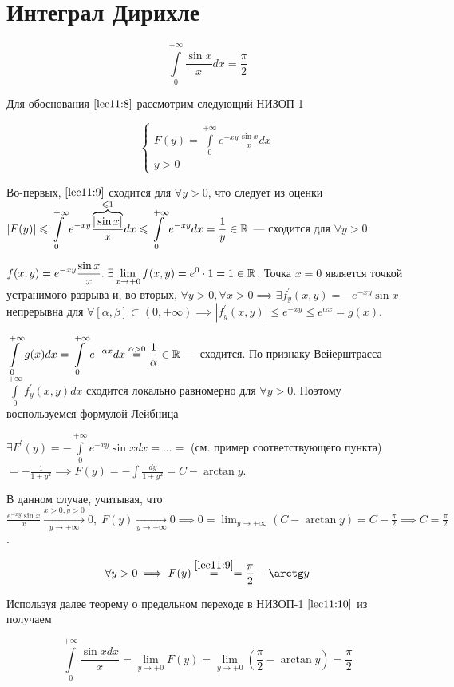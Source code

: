 \documentclass[../../main.tex]{subfiles}
\begin{document}
	\section{Интеграл Дирихле}
	
	\begin{equation}\label{lec11:8}
		\int\limits_0^{+\infty} \frac{\sin x}{x} dx = \frac{\pi}{2}
	\end{equation}	
	
	Для обоснования $\eqref{lec11:8}$ рассмотрим следующий НИЗОП-1
	
	\begin{equation}\label{lec11:9}
		\begin{cases}
			\displaystyle F(y) = \int\limits_0^{+\infty} e^{-xy} \frac{\sin x}{x} dx \\
			y > 0
		\end{cases}
	\end{equation}

	Во-первых, $\eqref{lec11:9}$ сходится для $\forall y > 0$, что следует из оценки $\displaystyle \left|F(y)\right| \leqslant \int\limits_0^{+\infty} e^{-xy} \frac{\overbrace{|\sin x|}^{\leqslant 1}}{x} dx \leqslant \int\limits_0^{+\infty} e^{-xy} dx = \frac{1}{y} \in \mathbb{R}$ --- сходится для $\forall y > 0$. 
	
	$\displaystyle f(x, y) = e^{-xy} \frac{\sin x}{x}. \; \exists \lim_{x \rightarrow +0} f(x, y) = e^0 \cdot 1 = 1 \in \mathbb{R}$. Точка $x = 0$ является точкой устранимого разрыва и, во-вторых, $\displaystyle\forall y > 0, \forall x > 0 \implies \exists f^{'}_y (x, y) = -e^{-xy} \sin x$ непрерывна для $\displaystyle\forall [\alpha, \beta] \subset (0, +\infty) \implies |f^{'}_y (x, y)| \leq e^{-xy} \leq e^{\alpha x} = g(x)$.
	
	$\displaystyle \int\limits_0^{+\infty} g(x) dx = \int\limits_0^{+\infty} e^{-\alpha x} dx \overset{\alpha > 0}{=} \frac{1}{\alpha} \in \mathbb{R}$ --- сходится. По признаку Вейерштрасса $\int\limits_0^{+\infty} f^{'}_y (x, y) dx$ сходится локально равномерно для $\forall y > 0$. Поэтому воспользуемся формулой Лейбница
	
	$\displaystyle \exists F^{'}(y) = - \int\limits_0^{+\infty} e^{-xy} \sin x dx = \ldots = $ (см. пример соответствующего пункта) $\displaystyle = - \frac{1}{1 + y^2} \implies F(y) = - \int \frac{dy}{1 + y^2} = C - \arctan y$.
	
	В данном случае, учитывая, что $\displaystyle\frac{e^{-xy} \sin x}{x} \overset{x > 0, y > 0}{\underset{y \rightarrow +\infty}{\longrightarrow}} 0, \; F(y) \underset{y \rightarrow +\infty}{\longrightarrow} 0 \implies 0 = \lim_{y \rightarrow +\infty} (C - \arctan y) = C - \frac{\pi}{2} \implies C = \frac{\pi}{2}$.

	\begin{equation}\label{lec11:10}
		\forall y > 0 \implies F(y) \overset{\eqref{lec11:9}}{=} = \frac{\pi}{2} - \arctan y
	\end{equation}

	Используя далее теорему о предельном переходе в НИЗОП-1 $\eqref{lec11:10}$ из получаем
	
	$$
	\int\limits_0^{+\infty} \frac{\sin x dx}{x} = \lim_{y \rightarrow +0} F(y) = \lim_{y \rightarrow +0} \left( \frac{\pi}{2} - \arctan y \right) = \frac{\pi}{2}
	$$
\end{document}
